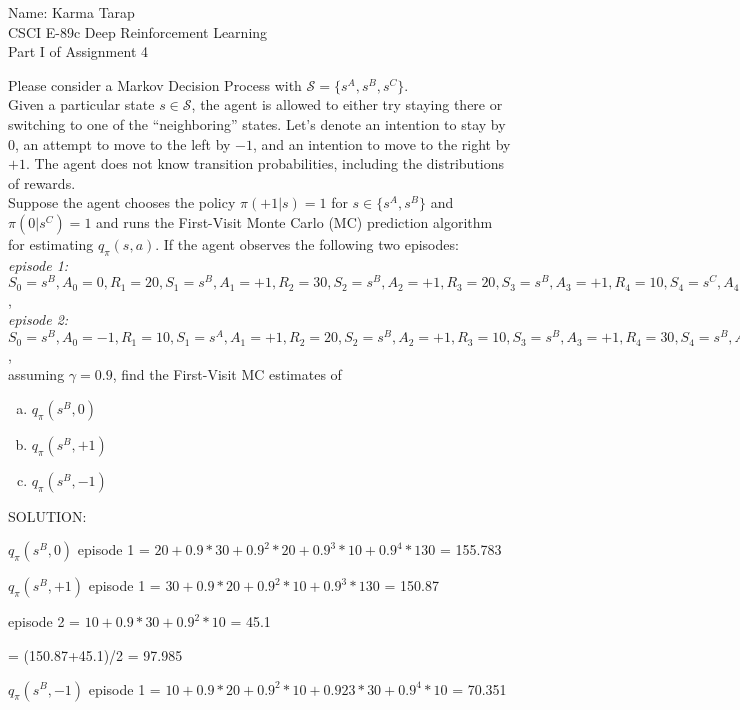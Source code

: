 \documentclass[12pt]{letter}
\begin{document}
\begin{flushleft}
{\sc Name: Karma Tarap}\\
CSCI E-89c Deep Reinforcement Learning\\
Part I of Assignment 4\\
\end{flushleft}

Please consider a Markov Decision Process with  $\mathcal{S}=\{s^{A},s^{B},s^{C}\}$.\medskip\\
Given a particular state $s\in \mathcal{S}$, the agent is allowed to either try staying there or switching to one of the ``neighboring'' states. Let's denote an intention to stay by $0$, an attempt to move to the left by $-1$, and an intention to move to the right by $+1$. The agent does not know transition probabilities, including the distributions of rewards.\medskip\\
Suppose the agent chooses the policy $\pi(+1|s)=1$ for $s\in\{s^A,s^B\}$ and $\pi(0|s^C)=1$ and runs the First-Visit Monte Carlo (MC) prediction algorithm for estimating $q_\pi(s,a)$. If the agent observes the following two episodes:\medskip\\
{\small
{\it episode 1:}\\
$S_0=s^B,A_0=0,R_1=20, S_1=s^B,A_1=+1,R_2=30, S_2=s^B,A_2=+1,R_3=20, S_3=s^B,A_3=+1,R_4=10, S_4=s^C,A_4=0,R_5=130$,\medskip\\
{\it episode 2:}\\
$S_0=s^B,A_0=-1,R_1=10, S_1=s^A,A_1=+1,R_2=20, S_2=s^B,A_2=+1,R_3=10, S_3=s^B,A_3=+1,R_4=30, S_4=s^B,A_4=+1,R_5=10$,\medskip\\}
assuming $\gamma=0.9$, find the First-Visit MC estimates of

\begin{enumerate}[(a)]
\item $q_\pi(s^B,0)$
\item $q_\pi(s^B,+1)$
\item $q_\pi(s^B,-1)$
\end{enumerate}
SOLUTION:

$q_\pi(s^B,0)$ 
episode 1 = $20 + 0.9 * 30 + 0.9^2 * 20 + 0.9^3 * 10 + 0.9^4 * 130 $
= 155.783

$q_\pi(s^B,+1)$ 
episode 1 = $30 + 0.9 * 20 + 0.9 ^2 * 10 + 0.9^3 * 130 $ = 150.87

episode 2 = $10 + 0.9 * 30 + 0.9 ^2 * 10 $ = 45.1

= (150.87+45.1)/2 = 97.985

$q_\pi(s^B,-1)$ 
episode 1 = $ 10 + 0.9 * 20 + 0.9^2 * 10 + 0.923 * 30 + 0.9^4 * 10$
= 70.351
\end{document}
